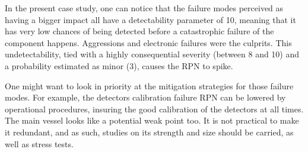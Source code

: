In the present case study, one can notice that the failure modes perceived as having a bigger impact all have a detectability parameter of 10, meaning that it has very low chances of being detected before a catastrophic failure of the component happens. Aggressions and electronic failures were the culprits. This undetectability, tied with a highly consequential severity (between 8 and 10) and a probability estimated as minor (3), causes the RPN to spike.

One might want to look in priority at the mitigation strategies for those failure modes. For example, the detectors calibration failure RPN can be lowered by operational procedures, insuring the good calibration of the detectors at all times. The main vessel looks like a potential weak point too. It is not practical to make it redundant, and as such, studies on its strength and size should be carried, as well as stress tests.
